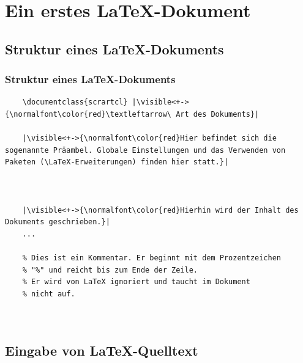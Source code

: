 \section{Ein erstes \LaTeX-Dokument}
\subsection{Struktur eines \LaTeX-Dokuments}

\begin{frame}[fragile]
	\frametitle{Struktur eines \LaTeX-Dokuments}
	\lstset{frame=L, numbers=left, xleftmargin=0.5cm}
	\only<+->{}
	\begin{lstlisting}
	\documentclass{scrartcl} |\visible<+->{\normalfont\color{red}\textleftarrow\ Art des Dokuments}|
	
	|\visible<+->{\normalfont\color{red}Hier befindet sich die sogenannte Präambel. Globale Einstellungen und das Verwenden von Paketen (\LaTeX-Erweiterungen) finden hier statt.}|
	
	
	
	|\visible<+->{\normalfont\color{red}Hierhin wird der Inhalt des Dokuments geschrieben.}|
	...
	
	% Dies ist ein Kommentar. Er beginnt mit dem Prozentzeichen
	% "%" und reicht bis zum Ende der Zeile.
	% Er wird von LaTeX ignoriert und taucht im Dokument
	% nicht auf.
	
	
	\end{lstlisting}
\end{frame}

\subsection{Eingabe von \LaTeX-Quelltext}

